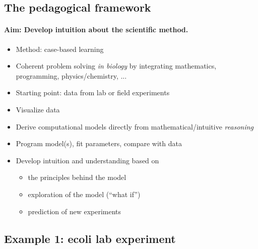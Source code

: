 \documentclass[%
twoside,                 %
final,                   %
10pt]{article}
\begin{document}
\noindent




\subsection{The pedagogical framework}


\paragraph{Aim: Develop intuition about the scientific method.}
\begin{itemize}
 \item Method: case-based learning

 \item Coherent problem solving \emph{in biology} by integrating
   mathematics, programming, physics/chemistry, ...

 \item Starting point: data from lab or field experiments

 \item Visualize data

 \item Derive computational models directly from mathematical/intuitive \emph{reasoning}

 \item Program model(s), fit parameters, compare with data

 \item Develop intuition and understanding based on
\begin{itemize}

  \item the principles behind the model

  \item exploration of the model (``what if'')

  \item prediction of new experiments
\end{itemize}

\noindent
\end{itemize}

\noindent



\subsection{Example 1: ecoli lab experiment}
\end{document}
